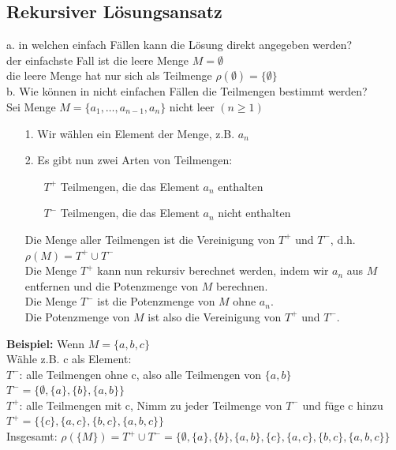 \documentclass{scrreprt}
\newcommand\tab[1][1cm]{\hspace*{#1}}
\begin{document}
\subsection{Rekursiver Lösungsansatz}
a. in welchen einfach Fällen kann die Lösung direkt angegeben werden?
\\\tab der einfachste Fall ist die leere Menge $M = \emptyset$
\\\tab die leere Menge hat nur sich als Teilmenge $\rho(\emptyset) = \{\emptyset\}$
\\b. Wie können in nicht einfachen Fällen die Teilmengen bestimmt werden?
\\\tab Sei Menge $M = \{a_1,\ldots,a_{n-1},a_n\}$ nicht leer $(n\geq1)$
\begin{itemize}
  \item [1.] Wir wählen ein Element der Menge, z.B. $a_n$
  \item [2.] Es gibt nun zwei Arten von Teilmengen:
  \begin{itemize}
    \item [$T^+$] Teilmengen, die das Element $a_n$ enthalten
    \item [$T^-$] Teilmengen, die das Element $a_n$ nicht enthalten
  \end{itemize}
  Die Menge aller Teilmengen ist die Vereinigung von $T^+$ und $T^-$, d.h. $\rho(M) = T^+ \cup T^-$
  \\Die Menge $T^+$ kann nun rekursiv berechnet werden, indem wir $a_n$ aus $M$ entfernen und die Potenzmenge von $M$ berechnen.
  \\Die Menge $T^-$ ist die Potenzmenge von $M$ ohne $a_n$.
  \\Die Potenzmenge von $M$ ist also die Vereinigung von $T^+$ und $T^-$.
\end{itemize}
\textbf{Beispiel:} Wenn $M = \{a,b,c\}$
\\\tab Wähle z.B. c als Element:
\\\tab $T^-$: alle Teilmengen ohne c, also alle Teilmengen von $\{a,b\}$
\\\tab\tab $T^- =\{\emptyset,\{a\},\{b\},\{a,b\}\}$
\\\tab $T^+$: alle Teilmengen mit c, Nimm zu jeder Teilmenge von $T^-$ und füge c hinzu
\\\tab\tab $T^+ = \{\{c\},\{a,c\},\{b,c\},\{a,b,c\}\}$
\\\tab Insgesamt: $\rho(\{M\}) = T^+ \cup T^- =\{\emptyset,\{a\},\{b\},\{a,b\},\{c\},\{a,c\},\{b,c\},\{a,b,c\}\}$
\end{document}
